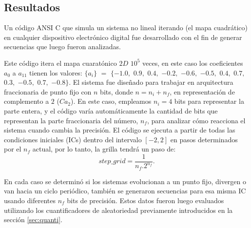 \subsection{Resultados}
\label{sec:results}

Un código ANSI C que simula un sistema no lineal iterando (el mapa cuadrático) en cualquier dispositivo electrónico digital fue desarrollado con el fin de generar secuencias que luego fueron analizadas.

Este código itera el mapa cuaratónico $2D$ $10 ^ 5$ veces, en este caso los coeficientes $a_0$ a $a_ {11}$ tienen los valores: $\{a_i \}$ $=$ $\{- 1.0,$ $0.9,$ $0.4,$ $-0.2,$ $-0.6,$ $-0.5,$ $0.4,$ $0.7,$ $0.3,$ $-0.5,$ $0.7,$ $-0.8 \}$.
El sistema fue diseñado para trabajar en arquitectura fraccionaria de punto fijo con $n$ bits, donde $n = n_i + n_f$, en representación de complemento a $2$ ($Ca_2$).
En este caso, empleamos $n_i = 4$ bits para representar la parte entera, y el código varía automáticamente la cantidad de bits que representan la parte fraccionaria del número, $n_f$, para analizar cómo reacciona el sistema cuando cambia la precisión.
El código se ejecuta a partir de todas las condiciones iniciales (ICs) dentro del intervalo $[-2,2]$ en pasos determinados por el $n_f$ actual, por lo tanto, la grilla tendrá un paso de:
%
\begin{equation}
step\_grid=\frac{1}{n_f.2^{n_f}}.
\end{equation}

En cada caso se determinó si los sistemas evolucionan a un punto fijo, divergen o van hacia un ciclo periódico, también se generaron secuencias para esa misma IC usando diferentes $n_f$ bits de precisión.
Estos datos fueron luego evaluados utilizando los cuantificadores de aleatoriedad previamente introducidos en la sección \ref{sec:quanti}.

